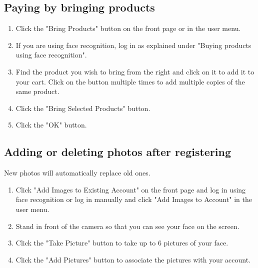 \documentclass[11pt]{article}
\begin{document}
\subsection{Paying by bringing products}
\begin{enumerate}
\item{Click the "Bring Products" button on the front page or in the user menu.}
\item{If you are using face recognition, log in as explained under "Buying products using
face recognition".}
\item{Find the product you wish to bring from the right and click on it to add it to your cart.
Click on the button multiple times to add multiple copies of the same product.}
\item{Click the "Bring Selected Products" button.}
\item{Click the "OK" button.}
\end{enumerate}
\subsection{Adding or deleting photos after registering}
New photos will automatically replace old ones.
\begin{enumerate}
\item{Click "Add Images to Existing Account" on the front page and log in using face recognition
or log in manually and click "Add Images to Account" in the user menu.}
\item{Stand in front of the camera so that you can see your face on the screen.}
\item{Click the "Take Picture" button to take up to 6 pictures of your face.}
\item{Click the "Add Pictures" button to associate the pictures with your account.}
\end{enumerate}
\end{document}
